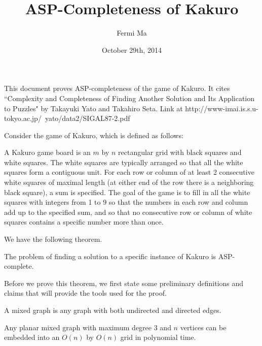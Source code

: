 \documentclass[runningheads,a4paper]{llncs}
\date{October 29th, 2014}							%
\begin{document}
\title{ASP-Completeness of Kakuro}
\titlerunning{}

\author{Fermi Ma}
%



\maketitle

This document proves ASP-completeness of the game of Kakuro. It cites ``Complexity and Completeness of Finding Another Solution and Its Application to Puzzles" by Takayuki Yato and Takahiro Seta. Link at http://www-imai.is.s.u-tokyo.ac.jp/~yato/data2/SIGAL87-2.pdf

Consider the game of Kakuro, which is defined as follows:

A Kakuro game board is an $m$ by $n$ rectangular grid with black squares and white squares. The white squares are typically arranged so that all the white squares form a contiguous unit. For each row or column of at least 2 consecutive white squares of maximal length (at either end of the row there is a neighboring black square), a sum is specified. The goal of the game is to fill in all the white squares with integers from 1 to 9 so that the numbers in each row and column add up to the specified sum, and so that no consecutive row or column of white squares contains a specific number more than once.

We have the following theorem.

\begin{theorem}
\label{KakuroASP}
The problem of finding a solution to a specific instance of Kakuro is ASP-complete.
\end{theorem}

Before we prove this theorem, we first state some preliminary definitions and claims that will provide the tools used for the proof.

\begin{definition}
A mixed graph is any graph with both undirected and directed edges.
\end{definition}

\begin{lemma}
Any planar mixed graph with maximum degree $3$ and $n$ vertices can be embedded into an $O(n)$ by $O(n)$ grid in polynomial time.
\end{lemma}
\end{document}
